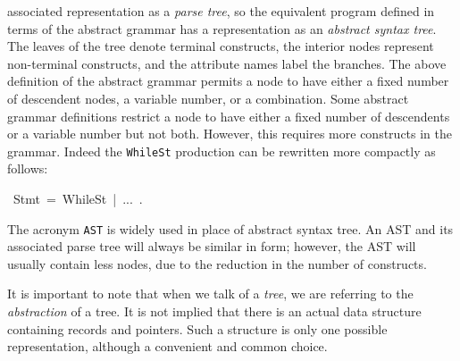 {{associated representation as a {\it parse tree}, so the equivalent
program defined in terms of the abstract grammar has a representation
as an {\it abstract syntax tree}. The leaves of the tree denote
terminal constructs, the interior nodes represent non-terminal
constructs, and the attribute names label the branches. The above
definition of the abstract grammar permits a node to have either a
fixed number of descendent nodes, a variable number, or a combination.
Some abstract grammar definitions restrict a node to have either a
fixed number of descendents or a variable number but not both.
However, this requires more constructs in the grammar. Indeed the
{\tt WhileSt} production can be rewritten more compactly as follows:
\par
\par{}\noindent\par
{\display ~Stmt~=~WhileSt~|~...~.}\noindent\par
\medskip\noindent%
The acronym {\tt AST} is widely used in place of abstract syntax tree. An
AST and its associated parse tree will always be similar in form;
however, the AST will usually contain less nodes, due to the reduction
in the number of constructs.
\par
It is important to note that when we talk of a {\it tree}, we are
referring to the {\it abstraction} of a tree. It is not implied
that there is an actual data structure containing records and
pointers. Such a structure is only one possible representation,
although a convenient and common choice.
\par
}}
